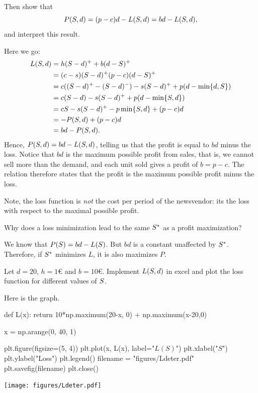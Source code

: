 \begin{exercise}
Then show that 
\begin{equation}\label{eq:24}
P(S, d) = (p-c)d - L(S, d) = b d - L(S, d),
\end{equation}
and  interpret this result.
\begin{solution}
    Here we go:
    \begin{align*}
L(S, d) 
&= h(S-d)^+ + b(d-S)^+ \\
&= (c-s)(S-d)^+ (p-c)(d-S)^+ \\
&= c((S-d)^+ - (S-d)^-) -s (S-d)^+ + p(d-\min\{d,S\}) \\
&= c(S-d) -s (S-d)^+ + p(d-\min\{S,d\}) \\
&= cS -s (S-d)^+ - p \min\{S,d\} + (p-c)d \\
&= -P(S, d) + (p-c)d\\
&= bd -P(S,d ).
    \end{align*}
Hence, $P(S, d) = b d - L(S, d)$, telling us that the profit is equal to $b d$ minus the loss. Notice that $b d$ is the maximum possible profit from sales, that is, we cannot sell more than the demand, and each unit sold gives a profit of $b= p-c$. The relation therefore states that the profit is  the maximum possible profit minus the loss. 

Note, the loss function is \emph{not} the cost per period of the newsvendor: its the loss with respect to the maximal possible profit. 
  \end{solution}
\end{exercise}

\begin{exercise}
Why does a  loss minimization lead to the same $S^*$ as a profit maximization?
\begin{solution}
We know that $P(S) = b d - L(S)$. But $b d$ is a constant unaffected by $S^*$. Therefore, if $S^*$  minimizes $L$, it is also maximizes $P$. 
\end{solution}
\end{exercise}


\begin{exercise}\label{ex:nw_det}
Let $d=20$, $h=1$€ and $b=10$€. Implement $L(S, d)$ in excel and plot the loss function for different values of $S$. 
\begin{solution}
Here is the graph.
\begin{pycode}[news]
def L(x):
    return 10*np.maximum(20-x, 0) + np.maximum(x-20,0)

x = np.arange(0, 40, 1)

plt.figure(figsize=(5, 4))
plt.plot(x, L(x), label="$L(S)$")
plt.xlabel("$S$")
plt.ylabel("Loss")
plt.legend()
filename = "figures/Ldeter.pdf"
plt.savefig(filename)
plt.close()
\end{pycode}

\centering
\texttt{[image: figures/Ldeter.pdf]}
\end{solution}
\end{exercise}

